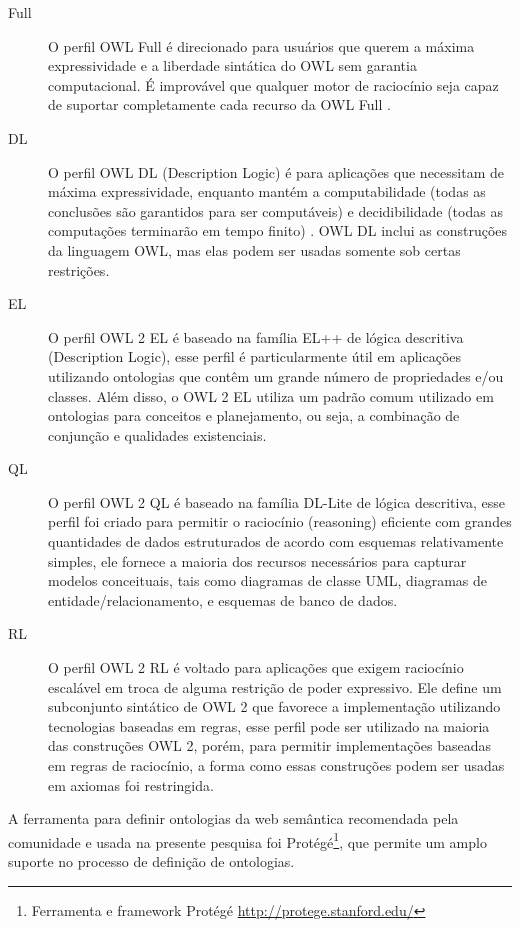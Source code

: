 %
\begin{description}
\item [{Full}] \foreignlanguage{brazil}{O perfil }OWL Full\foreignlanguage{brazil}{
é direcionado para usuários que querem a máxima expressividade e a
liberdade sintática do }OWL\foreignlanguage{brazil}{ sem garantia
computacional. É improvável que qualquer motor de raciocínio seja
capaz de suportar completamente cada recurso da }OWL Full\foreignlanguage{brazil}{
\citep{mcguinness2004owl}.}
%
\item [{DL}] O perfil \foreignlanguage{english}{OWL DL} (\foreignlanguage{english}{Description
Logic}) é para aplicações que necessitam de máxima expressividade,
enquanto mantém a computabilidade (todas as conclusões são garantidos
para ser computáveis) e decidibilidade (todas as computações terminarão
em tempo finito) \citep{mcguinness2004owl}. \foreignlanguage{english}{OWL
DL} inclui as construções da linguagem \foreignlanguage{english}{OWL},
mas elas podem ser usadas somente sob certas restrições. 
\item [{EL}] O perfil \foreignlanguage{english}{OWL} 2 EL é baseado na
família EL++ de lógica descritiva (\foreignlanguage{english}{Description}
\foreignlanguage{english}{Logic}), esse perfil é particularmente útil
em aplicações utilizando ontologias que contêm um grande número de
propriedades e/ou classes. Além disso, o \foreignlanguage{english}{OWL}
2 EL utiliza um padrão comum utilizado em ontologias para conceitos
e planejamento, ou seja, a combinação de conjunção e qualidades existenciais.
%
\item [{QL}] \foreignlanguage{brazil}{O perfil }OWL 2 QL\foreignlanguage{brazil}{
é baseado na família }DL-Lite\foreignlanguage{brazil}{ de lógica descritiva,
esse perfil foi criado para permitir o raciocínio (}reasoning\foreignlanguage{brazil}{)
eficiente com grandes quantidades de dados estruturados de acordo
com esquemas relativamente simples, ele fornece a maioria dos recursos
necessários para capturar modelos conceituais, tais como diagramas
de classe UML, diagramas de entidade/relacionamento, e esquemas de
banco de dados. }
%
\item [{RL}] O perfil \foreignlanguage{english}{OWL 2 RL} é voltado para
aplicações que exigem raciocínio escalável em troca de alguma restrição
de poder expressivo. Ele define um subconjunto sintático de \foreignlanguage{english}{OWL
2} que favorece a implementação utilizando tecnologias baseadas em
regras, esse perfil pode ser utilizado na maioria das construções
\foreignlanguage{english}{OWL 2}, porém, para permitir implementações
baseadas em regras de raciocínio, a forma como essas construções podem
ser usadas em axiomas foi restringida. 
\end{description}
%
A ferramenta para definir ontologias da web semântica recomendada
pela comunidade e usada na presente pesquisa foi Protégé\footnote{Ferramenta e framework Protégé \url{http://protege.stanford.edu/}},
que permite um amplo suporte no processo de definição de ontologias.
%

